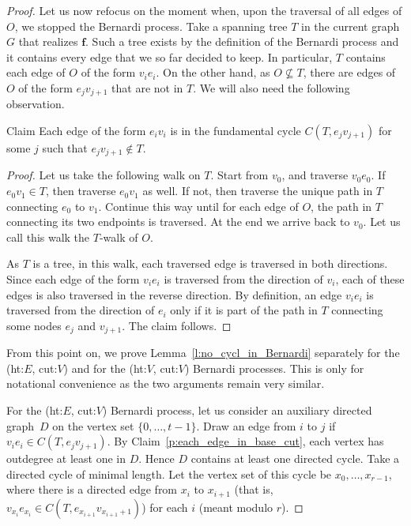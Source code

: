 \documentclass[ALCO,ThmDefs,Unicode,epreuves]{cedram}
\newenvironment{claim}{\begin{enonce}{Claim}}{\end{enonce}}
\begin{document}
\begin{proof}
Let us now refocus on the moment when, upon the traversal of all edges of $O$, we stopped the Bernardi process. Take a spanning tree $T$ in the current graph $G$ that realizes $\mathbf f$. Such a tree exists by the definition of the Bernardi process and it contains every edge that we so far decided to keep. In particular, $T$ contains each edge of $O$ of the form $v_ie_i$. On the other hand, as $O\not\subseteq T$, there are edges of $O$ of the form $e_jv_{j+1}$ that are not in $T$. We will also need the following observation.

\begin{claim}\label{p:each_edge_in_base_cut}
	Each edge of the form $e_iv_i$ is in the fundamental cycle $C(T,e_jv_{j+1})$ for some $j$ such that $e_jv_{j+1}\notin T$.
\end{claim}

\begin{proof}
Let us take the following walk on $T$. Start from $v_0$, and traverse $v_0e_0$. If $e_0v_1\in T$, then traverse $e_0v_1$ as well. If not, then traverse the unique path in $T$ connecting $e_0$ to $v_1$. Continue this way until for each edge of $O$, the path in $T$ connecting its two endpoints is traversed. At the end we arrive back to $v_0$. Let us call this walk the $T$-walk of $O$.

As $T$ is a tree, in this walk, each traversed edge is traversed in both directions. Since each edge of the form $v_ie_i$ is traversed from the direction of $v_i$, each of these edges is also traversed in the reverse direction. By definition, an edge $v_ie_i$ is traversed from the direction of $e_i$ only if it is part of the path in $T$ connecting some nodes $e_j$ and $v_{j+1}$. The claim follows.
\end{proof}

From this point on, we prove Lemma~\ref{l:no_cycl_in_Bernardi} separately for the (ht:$E$, cut:$V$) and for the (ht:$V$, cut:$V$) Bernardi processes. This is only for notational convenience as the two arguments remain very similar.

For the (ht:$E$, cut:$V$) Bernardi process, let us consider an auxiliary directed graph~$D$ on the vertex set $\{0,\dots,t-1\}$. Draw an edge from $i$ to $j$ if $v_{i}e_{i}\in C(T,e_jv_{j+1})$. By Claim~\ref{p:each_edge_in_base_cut}, each vertex has outdegree at least one in $D$. Hence $D$ contains at least one directed cycle. Take a directed cycle of minimal length. Let the vertex set of this cycle be $x_0,\dots,x_{r-1}$, where there is a directed edge from $x_i$ to $x_{i+1}$ (that is, $v_{x_i}e_{x_i}\in C(T,e_{x_{i+1}}v_{x_{i+1}+1})$) for each $i$ (meant modulo $r$).


\end{proof}
\end{document}
